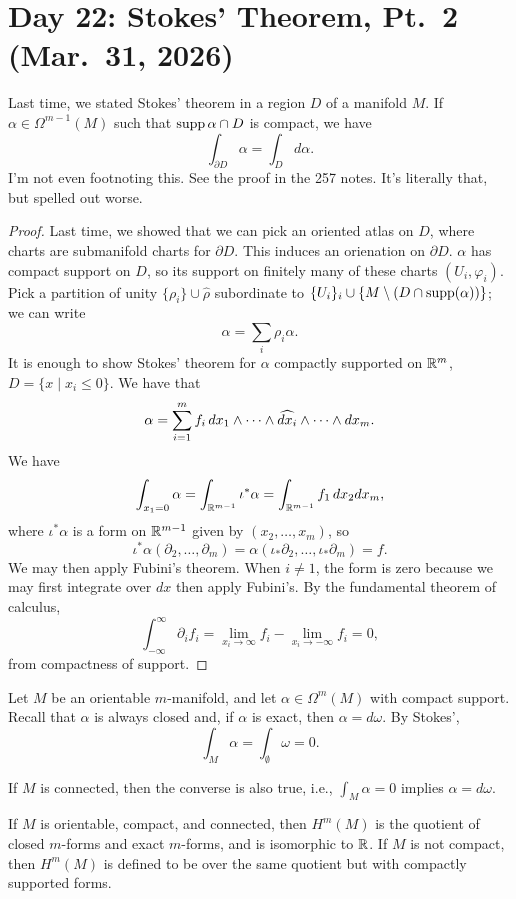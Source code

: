 \section{Day 22: Stokes' Theorem, Pt.\ 2 (Mar.\ 31, 2026)}
Last time, we stated Stokes' theorem in a region $D$ of a manifold $M$. If $\alpha \in \Omega^{m-1}(M)$ such that $\operatorname{supp} \alpha \cap D$ is compact, we have
\[ \int_{\partial D} \alpha = \int_D d\alpha. \]
{\color{crimson} I'm not even footnoting this. See the proof in the 257 notes. It's literally that, but spelled out worse.}
\begin{proof}
    Last time, we showed that we can pick an oriented atlas on $D$, where charts are submanifold charts for $\partial D$. This induces an orienation on $\partial D$. $\alpha$ has compact support on $D$, so its support on finitely many of these charts $(U_i, \varphi_i)$. Pick a partition of unity $\{\rho_i\} \cup \hat \rho$ subordinate to $\{U_i\}_i \cup \{M \setminus (D \cap \operatorname{supp}(\alpha))\}$; we can write
    \[ \alpha = \sum_i \rho_i \alpha. \]
    It is enough to show Stokes' theorem for $\alpha$ compactly supported on $\mathbb R^m$, $D = \{x \mid x_i \leq 0\}$. We have that
    \[ \alpha = \sum_{i=1}^m f_i \, dx_1 \wedge \dots \wedge \widehat{dx_i} \wedge \dots \wedge dx_m. \]
    We have
    \[ \int_{x_1 = 0} \alpha = \int_{\mathbb R^{m-1}} \iota^\ast \alpha = \int_{\mathbb R^{m-1}} f_1 \, dx_2 dx_m, \]
    where $\iota^\ast \alpha$ is a form on $\mathbb R^{m-1}$ given by $(x_2, \dots, x_m)$, so
    \[ \iota^\ast \alpha (\partial_2, \dots, \partial_m) = \alpha(\iota_\ast \partial_2, \dots, \iota_\ast \partial_m) = f. \]
    We may then apply Fubini's theorem. When $i \neq 1$, the form is zero because we may first integrate over $dx$ then apply Fubini's. By the fundamental theorem of calculus,
    \[ \int_{-\infty}^\infty \partial_i f_i = \lim_{x_i \to \infty} f_i - \lim_{x_i \to -\infty} f_i = 0, \]
    from compactness of support.
\end{proof}
\begin{corollary}
    Let $M$ be an orientable $m$-manifold, and let $\alpha \in \Omega^m(M)$ with compact support. Recall that $\alpha$ is always closed and, if $\alpha$ is exact, then $\alpha = d\omega$. By Stokes',
    \[ \int_M \alpha = \int_{\emptyset} \omega = 0. \]
\end{corollary}
\begin{fact}
    If $M$ is connected, then the converse is also true, i.e., $\int_M \alpha = 0$ implies $\alpha = d\omega$.
\end{fact}
\begin{corollary}[p.179]
    If $M$ is orientable, compact, and connected, then $H^m(M)$ is the quotient of closed $m$-forms and exact $m$-forms, and is isomorphic to $\mathbb R$. If $M$ is not compact, then $H^m(M)$ is defined to be over the same quotient but with compactly supported forms.
\end{corollary}

